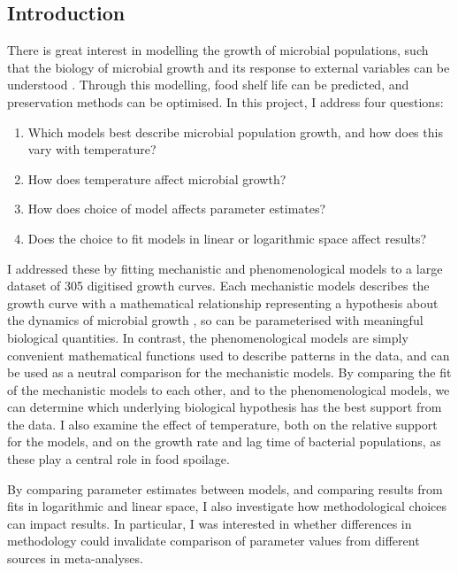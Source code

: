 \documentclass[11pt, a4paper]{article}
\begin{document}
\begin{linenumbers}
    \section{Introduction}
    
    There is great interest in modelling the growth of microbial populations, such that the biology of microbial growth and its response to external variables can be understood \cite{zwitmodelling}. Through this modelling, food shelf life can be predicted, and preservation methods can be optimised. In this project, I address four questions:    

\begin{enumerate}
  \item Which models best describe microbial population growth, and how does this vary with temperature?
  \item How does temperature affect microbial growth?
  \item How does choice of model affects parameter estimates?
  \item Does the choice to fit models in linear or logarithmic space affect results?
  \end{enumerate}


I addressed these by fitting mechanistic and phenomenological models to a large dataset of 305 digitised growth curves. Each mechanistic models describes the growth curve with a mathematical relationship representing a hypothesis about the dynamics of microbial growth \cite{Buchanan}, so can be parameterised with meaningful biological quantities. In contrast, the phenomenological models are simply convenient mathematical functions used to describe patterns in the data, and can be used as a neutral comparison for the mechanistic models. By comparing the fit of the mechanistic models to each other, and to the phenomenological models, we can determine which underlying biological hypothesis has the best support from the data. I also examine the effect of temperature, both on the relative support for the models, and on the growth rate and lag time of bacterial populations, as these play a central role in food spoilage. 

By comparing parameter estimates between models, and comparing results from fits in logarithmic and linear space, I also investigate how methodological choices can impact results. In particular, I was interested in whether differences in methodology could invalidate comparison of parameter values from different sources in meta-analyses.


\end{linenumbers}
\end{document}
